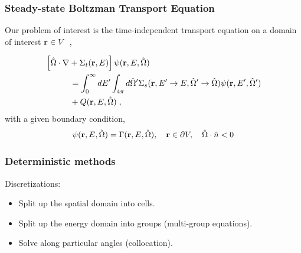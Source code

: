 \documentclass[xcolor=x11names, compress]{beamer}
\begin{document}
\begin{frame}
  \frametitle{Steady-state Boltzman Transport Equation}
  Our problem of interest is the time-independent transport equation
  on a domain of interest $\mathbf{r} \in V$~\cite{lewis1993},
  
\begin{align*}
  &\left[ \hat{\Omega}\cdot  \nabla + \Sigma_t(\mathbf{r},E) \right] \psi(\mathbf{r},E,\hat{\Omega})\\
  & \quad \quad \quad= \int_0^{\infty}dE'\int_{4\pi}d\hat{\Omega}'\Sigma_s(\mathbf{r}, E'\rightarrow E,\hat{\Omega}'\rightarrow\hat{\Omega})
    \psi(\mathbf{r},E',\hat{\Omega}') \\ & \quad \quad \quad+ Q(\mathbf{r}, E, \hat{\Omega})\;,
\end{align*}
with a given boundary condition,
\begin{align*}
  \psi(\mathbf{r},E,\hat{\Omega}) = \Gamma(\mathbf{r}, E, \hat{\Omega}), \quad \mathbf{r} \in \partial V,
  \quad \hat{\Omega} \cdot \hat{n} < 0
\end{align*}  
\end{frame}
\begin{frame}
  \frametitle{Deterministic methods}
  Discretizations:
  \begin{itemize}
  \item<1-> Split up the spatial domain into cells.
  \item<2-> Split up the energy domain into groups (multi-group equations).    
  \item<3-> Solve along particular angles (collocation).
  \end{itemize}
\end{frame}
\end{document}
